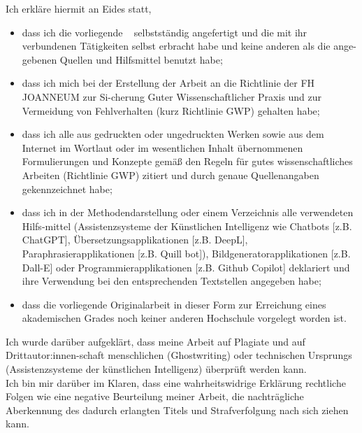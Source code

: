 %

\thispagestyle{empty}
 {\hfill\fontfamily{\sfdefault}\bfseries\fontsize{22}{22}\selectfont{Eidesstattliche Erklärung}}\vspace*{1cm}

\noindent Ich erkläre hiermit an Eides statt,

\begin{itemize}
	\item {dass ich die vorliegende \DocTypeText~ selbstständig angefertigt und die mit ihr verbundenen Tätigkeiten selbst erbracht habe und keine anderen als die ange-gebenen Quellen und Hilfsmittel benutzt habe;}
	\item {dass ich mich bei der Erstellung der Arbeit an die Richtlinie der FH JOANNEUM zur Si-cherung Guter Wissenschaftlicher Praxis und zur Vermeidung von Fehlverhalten (kurz Richtlinie GWP) gehalten habe;}
	\item {dass ich alle aus gedruckten oder ungedruckten Werken sowie aus dem Internet im Wortlaut oder im wesentlichen Inhalt übernommenen Formulierungen und Konzepte gemäß den Regeln für gutes wissenschaftliches Arbeiten (Richtlinie GWP) zitiert und durch genaue Quellenangaben gekennzeichnet habe;}
	\item {dass ich in der Methodendarstellung oder einem Verzeichnis alle verwendeten Hilfs-mittel (Assistenzsysteme der Künstlichen Intelligenz wie Chatbots [z.B. ChatGPT], Übersetzungsapplikationen [z.B. DeepL], Paraphrasierapplikationen [z.B. Quill bot]), Bildgeneratorapplikationen [z.B. Dall-E] oder Programmierapplikationen [z.B. Github Copilot] deklariert und ihre Verwendung bei den entsprechenden Textstellen angegeben habe;}
	\item {dass die vorliegende Originalarbeit in dieser Form zur Erreichung eines akademischen Grades noch keiner anderen Hochschule vorgelegt worden ist.}
\end{itemize}

\noindent Ich wurde darüber aufgeklärt, dass meine Arbeit auf Plagiate und auf Drittautor:innen-schaft menschlichen (Ghostwriting) oder technischen Ursprungs (Assistenzsysteme der künstlichen Intelligenz) überprüft werden kann.\\

\noindent Ich bin mir darüber im Klaren, dass eine wahrheitswidrige Erklärung rechtliche Folgen wie eine negative Beurteilung meiner Arbeit, die nachträgliche Aberkennung des dadurch erlangten Titels und Strafverfolgung nach sich ziehen kann.


\ifthenelse{\equal{\Style}{\Book}}
{
	\newpage\null\thispagestyle{empty}\newpage
}
{
}


